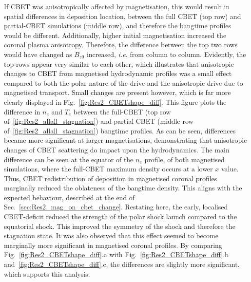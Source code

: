 If \ac{CBET} was anisotropically affected by magnetisation, this would result in spatial differences in deposition location, between the full \ac{CBET} (top row) and partial-\ac{CBET} simulations (middle row), and therefore the bangtime profiles would be different.
Additionally, higher initial magnetisation increased the coronal plasma anisotropy.
Therefore, the difference between the top two rows would have changed as $B_{z0}$ increased, \textit{i.e.} from column to column.
Evidently, the top rows appear very similar to each other, which illustrates that anisotropic changes to \ac{CBET} from magnetised hydrodynamic profiles was a small effect compared to both the polar nature of the drive and the anisotropic drive due to magnetised transport.
Small changes are present however, which is far more clearly displayed in Fig.~\ref{fig:Res2_CBETshape_diff}.
This figure plots the difference in $n_e$ and $T_e$ between the full-\ac{CBET} (top row of~\ref{fig:Res2_allall_stagnation}) and partial-\ac{CBET} (middle row of~\ref{fig:Res2_allall_stagnation}) bangtime profiles.
As can be seen, differences became more significant at larger magnetisations, demonstrating that anisotropic changes of \ac{CBET} scattering do impact upon the hydrodynamics.
The main difference can be seen at the equator of the $n_e$ profile, of both magnetised simulations, where the full-\ac{CBET} maximum density occurs at a lower $x$ value.
Thus, \ac{CBET} redistribution of deposition in magnetised coronal profiles marginally reduced the oblateness of the bangtime density.
This aligns with the expected behaviour, described at the end of Sec.~\ref{sec:Res2_mag_on_cbet_change}.
Restating here, the early, localised \ac{CBET}-deficit reduced the strength of the polar shock launch compared to the equatorial shock.
This improved the symmetry of the shock and therefore the stagnation state.
It was also observed that this effect seemed to become marginally more significant in magnetised coronal profiles.
By comparing Fig.~\ref{fig:Res2_CBETshape_diff}.a with Fig.~\ref{fig:Res2_CBETshape_diff}.b and~\ref{fig:Res2_CBETshape_diff}.c, the differences are slightly more significant, which supports this analysis.

